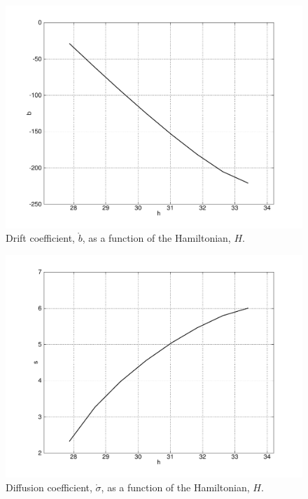 \begin{figure}
\begin{center}
\includegraphics[width=\textwidth*7/8]{figures/oscillator_drift}
\caption{Drift coefficient, $\mathring b$, as a function of the Hamiltonian, $H$.}
\label{f:drift}
\end{center}
\end{figure}

\begin{figure}
\begin{center}
\includegraphics[width=\textwidth*7/8]{figures/oscillator_diffusion}
\caption{Diffusion coefficient, $\mathring \sigma$, as a function of the Hamiltonian, $H$.}
\label{f:diffusion}
\end{center}
\end{figure}

